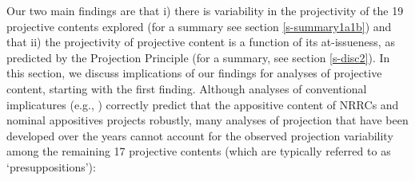 \documentclass[11pt,fleqn]{article}
\newcommand{\6}{\mbox{$[\hspace*{-.6mm}[$}}
\newcommand{\9}{\mbox{$]\hspace*{-.6mm}]$}}
\begin{document}
Our two main findings are that i) there is variability in the projectivity of the 19 projective contents explored (for a summary see section \ref{s-summary1a1b}) and that ii) the projectivity of projective content is a function of its at-issueness, as predicted by the Projection Principle (for a summary, see section \ref{s-disc2}). In this section, we discuss implications of our findings for analyses of projective content, starting with the first finding.  Although analyses of conventional implicatures (e.g., \citealt{potts05,murray2014,anderbois-etal2015}) correctly predict that the appositive content of NRRCs and nominal appositives projects robustly, many analyses of projection that have been developed over the years cannot account for the observed projection variability among the remaining 17 projective contents (which are typically referred to as `presuppositions'):
\end{document}
